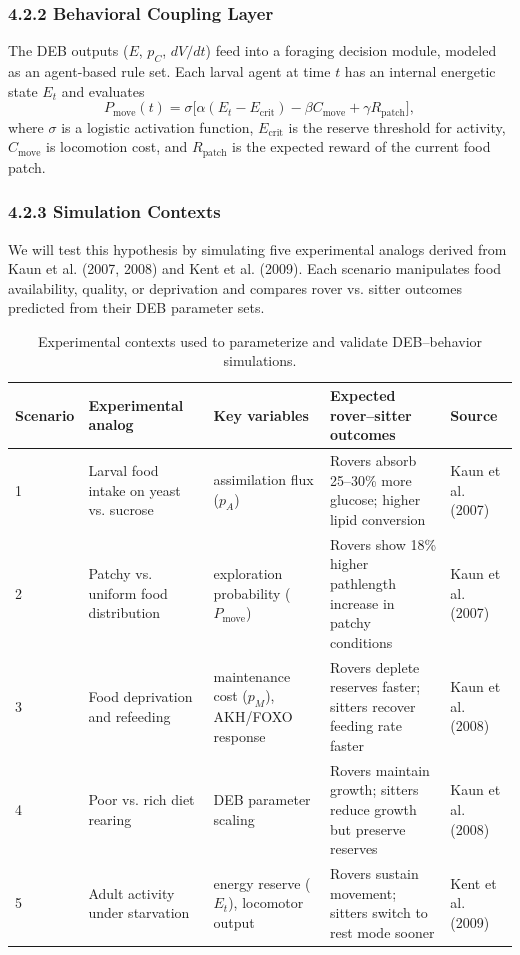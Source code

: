 \documentclass[11pt]{article}
\begin{document}
\subsubsection*{4.2.2 Behavioral Coupling Layer}

The DEB outputs ($E$, $p_C$, $dV/dt$) feed into a foraging decision module, modeled as an agent-based rule set. Each larval agent at time $t$ has an internal energetic state $E_t$ and evaluates
\begin{equation}
P_{\text{move}}(t) = \sigma\big[\alpha(E_t - E_{\text{crit}}) - \beta C_{\text{move}} + \gamma R_{\text{patch}}\big],
\end{equation}
where $\sigma$ is a logistic activation function, $E_{\text{crit}}$ is the reserve threshold for activity, $C_{\text{move}}$ is locomotion cost, and $R_{\text{patch}}$ is the expected reward of the current food patch.

\subsubsection*{4.2.3 Simulation Contexts}

We will test this hypothesis by simulating five experimental analogs derived from Kaun et al. (2007, 2008) and Kent et al. (2009). Each scenario manipulates food availability, quality, or deprivation and compares rover vs. sitter outcomes predicted from their DEB parameter sets.

\begin{table}[ht]
  \centering
  \begin{tabular}{lllll}
    \toprule
    Scenario & Experimental analog & Key variables & Expected rover--sitter outcomes & Source \\
    \midrule
    1 & Larval food intake on yeast vs. sucrose & assimilation flux ($p_A$) & Rovers absorb 25--30\% more glucose; higher lipid conversion & Kaun et al. (2007) \\
    2 & Patchy vs. uniform food distribution & exploration probability ($P_{\text{move}}$) & Rovers show 18\% higher pathlength increase in patchy conditions & Kaun et al. (2007) \\
    3 & Food deprivation and refeeding & maintenance cost ($p_M$), AKH/FOXO response & Rovers deplete reserves faster; sitters recover feeding rate faster & Kaun et al. (2008) \\
    4 & Poor vs. rich diet rearing & DEB parameter scaling & Rovers maintain growth; sitters reduce growth but preserve reserves & Kaun et al. (2008) \\
    5 & Adult activity under starvation & energy reserve ($E_t$), locomotor output & Rovers sustain movement; sitters switch to rest mode sooner & Kent et al. (2009) \\
    \bottomrule
  \end{tabular}
  \caption{Experimental contexts used to parameterize and validate DEB--behavior simulations.}
\end{table}
\end{document}

